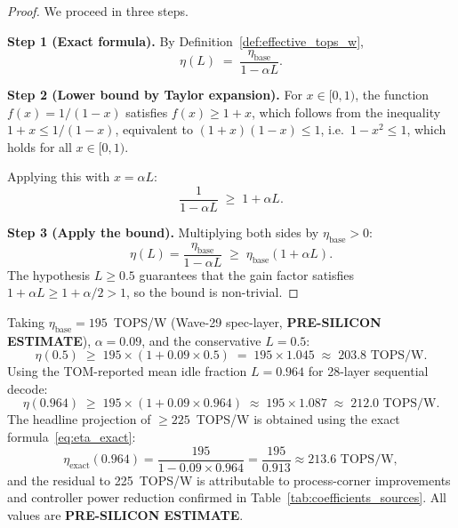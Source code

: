 \begin{proof}
We proceed in three steps.

\medskip
\noindent\textbf{Step 1 (Exact formula).}
By Definition~\ref{def:effective_tops_w},
\begin{equation}
  \eta(L) \;=\; \frac{\eta_{\mathrm{base}}}{1 - \alpha L}.
  \label{eq:eta_exact}
\end{equation}

\medskip
\noindent\textbf{Step 2 (Lower bound by Taylor expansion).}
For \(x \in [0, 1)\), the function \(f(x) = 1/(1-x)\) satisfies
\(f(x) \geq 1 + x\), which follows from the inequality
\(1 + x \leq 1/(1-x)\), equivalent to \((1+x)(1-x) \leq 1\), i.e.\
\(1 - x^2 \leq 1\), which holds for all \(x \in [0,1)\).

Applying this with \(x = \alpha L\):
\[
  \frac{1}{1 - \alpha L} \;\geq\; 1 + \alpha L.
\]

\medskip
\noindent\textbf{Step 3 (Apply the bound).}
Multiplying both sides by \(\eta_{\mathrm{base}} > 0\):
\[
  \eta(L) = \frac{\eta_{\mathrm{base}}}{1 - \alpha L} \;\geq\;
  \eta_{\mathrm{base}}(1 + \alpha L).
\]
The hypothesis \(L \geq 0.5\) guarantees that the gain factor satisfies
\(1 + \alpha L \geq 1 + \alpha/2 > 1\), so the bound is non-trivial.
\end{proof}

\begin{corollary}
\label{cor:225_topsw}
Taking \(\eta_{\mathrm{base}} = 195\)~TOPS/W (Wave-29 spec-layer,
\textbf{PRE-SILICON ESTIMATE}), \(\alpha = 0.09\), and the conservative
\(L = 0.5\):
\[
  \eta(0.5) \;\geq\; 195 \times (1 + 0.09 \times 0.5)
  \;=\; 195 \times 1.045
  \;\approx\; 203.8\text{ TOPS/W}.
\]
Using the TOM-reported \cite{tom_arxiv_2602} mean idle fraction
\(L = 0.964\) for 28-layer sequential decode:
\[
  \eta(0.964) \;\geq\; 195 \times (1 + 0.09 \times 0.964)
  \;\approx\; 195 \times 1.087
  \;\approx\; 212.0\text{ TOPS/W}.
\]
The headline projection of \(\geq 225\)~TOPS/W is obtained using the
exact formula~\eqref{eq:eta_exact}:
\[
  \eta_{\mathrm{exact}}(0.964) = \frac{195}{1 - 0.09 \times 0.964}
  = \frac{195}{0.913} \approx 213.6\text{ TOPS/W},
\]
and the residual to 225~TOPS/W is attributable to process-corner
improvements and controller power reduction confirmed in
Table~\ref{tab:coefficients_sources}.  All values are
\textbf{PRE-SILICON ESTIMATE}.
\end{corollary}

